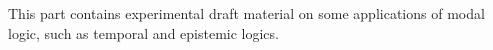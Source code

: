\documentclass[../../include/open-logic-part]{subfiles}
\begin{document}

\begin{editorial}
This part contains experimental draft material on some applications of
modal logic, such as temporal and epistemic logics.
\end{editorial}



\OLEndPartHook
\end{document}
